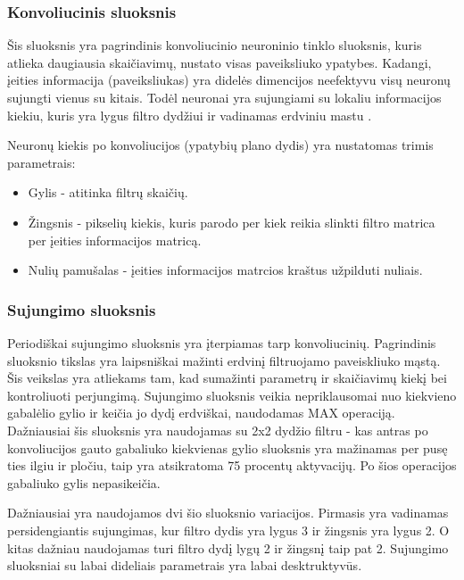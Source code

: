 \documentclass{VUMIFPSkursinis}
\begin{document}
\subsubsection{Konvoliucinis sluoksnis}
Šis sluoksnis yra pagrindinis konvoliucinio neuroninio tinklo sluoksnis, kuris atlieka daugiausia skaičiavimų, nustato visas paveiksliuko ypatybes.
Kadangi, įeities informacija (paveiksliukas) yra didelės dimencijos neefektyvu visų neuronų sujungti vienus su kitais. Todėl neuronai yra sujungiami
su lokaliu informacijos kiekiu, kuris yra lygus filtro dydžiui ir vadinamas erdviniu mastu \cite{layers-CS231n}.

Neuronų kiekis po konvoliucijos (ypatybių plano dydis) yra nustatomas trimis parametrais:
\begin{itemize}
\item Gylis - atitinka filtrų skaičių.
\item Žingsnis - pikselių kiekis, kuris parodo per kiek reikia slinkti filtro matrica per įeities informacijos matricą.
\item Nulių pamušalas - įeities informacijos matrcios kraštus užpilduti nuliais.
\end{itemize}

\subsubsection{Sujungimo sluoksnis}
Periodiškai sujungimo sluoksnis yra įterpiamas tarp konvoliucinių. Pagrindinis sluoksnio tikslas yra laipsniškai mažinti erdvinį filtruojamo paveiskliuko mąstą.
Šis veikslas yra atliekams tam, kad sumažinti parametrų ir skaičiavimų kiekį bei kontroliuoti perjungimą. Sujungimo sluoksnis veikia nepriklausomai nuo kiekvieno
gabalėlio gylio ir keičia jo dydį erdviškai, naudodamas MAX operaciją. Dažniausiai šis sluoksnis yra naudojamas su 2x2 dydžio filtru - kas antras po konvoliucijos 
gauto gabaliuko kiekvienas gylio sluoksnis yra mažinamas per pusę ties ilgiu ir pločiu, taip yra atsikratoma 75 procentų aktyvacijų. Po šios operacijos gabaliuko 
gylis nepasikeičia.

Dažniausiai yra naudojamos dvi šio sluoksnio variacijos. Pirmasis yra vadinamas persidengiantis sujungimas, kur filtro dydis yra lygus 3 ir žingsnis yra lygus 2. 
O kitas dažniau naudojamas turi filtro dydį lygų 2 ir žingsnį taip pat 2. Sujungimo sluoksniai su labai dideliais parametrais yra labai desktruktyvūs.
\end{document}
